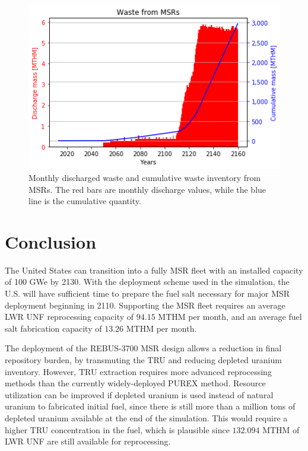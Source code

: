 \begin{figure}[htbp!]
	\begin{center}
		\includegraphics[scale=0.7]{./images/us/msr_waste.png}
	\end{center}
	\caption{Monthly discharged waste and cumulative waste inventory from
			\glspl{MSR}. The red bars are monthly discharge values, while
			the blue line is the cumulative quantity.}
	\label{fig:msr_waste}
\end{figure}


\section{Conclusion}
The United States can transition into a fully \gls{MSR} fleet with an
installed capacity of 100 GWe by 2130. With the deployment
scheme used in the simulation, the U.S. will have sufficient
time to prepare the fuel salt necessary for major \gls{MSR} deployment
beginning in 2110. Supporting the \gls{MSR} fleet requires an average
\gls{LWR} \gls{UNF} reprocessing capacity of $94.15$ MTHM per month, and an average fuel salt
fabrication capacity of $13.26$ MTHM per month. 

The deployment of the REBUS-3700 \gls{MSR} design allows a reduction
in final repository burden, by transmuting the \gls{TRU} and reducing depleted uranium inventory.
However, \gls{TRU} extraction requires more advanced reprocessing methods than the currently
widely-deployed PUREX method. Resource utilization can be improved if depleted
uranium is used instead of natural uranium to fabricated initial fuel, since
there is still more than a million tons of depleted uranium available at the
end of the simulation. This would require a higher \gls{TRU} concentration
in the fuel, which is plausible since $132.094$ MTHM of \gls{LWR} \gls{UNF}
are still available for reprocessing.

